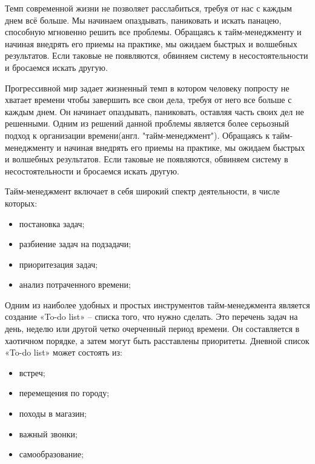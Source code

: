 \label{sec:intro}

Темп современной жизни не позволяет расслабиться, требуя от нас с каждым днем всё больше. Мы начинаем опаздывать, паниковать и искать панацею, способную мгновенно решить все проблемы. Обращаясь к тайм-менеджменту и начиная внедрять его приемы на практике, мы ожидаем быстрых и волшебных результатов. Если таковые не появляются, обвиняем систему в несостоятельности и бросаемся искать другую.

Прогрессивной мир задает жизненный темп в котором человеку попросту не хватает времени чтобы завершить все свои дела, требуя от него все больше с каждым днем. Он начинает опаздывать, паниковать, оставляя часть своих дел не решенными. Одним из решений данной проблемы является более серьозный подход к организации времени(англ. "тайм-менеджмент"). Обращаясь к тайм-менеджменту и начиная внедрять его приемы на практике, мы ожидаем быстрых и волшебных результатов. Если таковые не появляются, обвиняем систему в несостоятельности и бросаемся искать другую.

Тайм-менеджмент включает в себя широкий спектр деятельности, в числе которых:
\begin{itemize}
	\item постановка задач;
	\item разбиение задач на подзадачи;
	\item приоритезация задач;
	\item анализ потраченного времени;
\end{itemize}

Одним из наиболее удобных и простых инструментов тайм-менеджмента является создание «To-do list» – списка того, что нужно сделать. Это перечень задач на день, неделю или другой четко очерченный период времени. Он составляется в хаотичном порядке, а затем могут быть расставлены приоритеты.
Дневной список «To-do list» может состоять из:
\begin{itemize}
	\item встреч;
	\item перемещения по городу;
	\item походы в магазин;
	\item важный звонки;
	\item самообразование;
\end{itemize}



